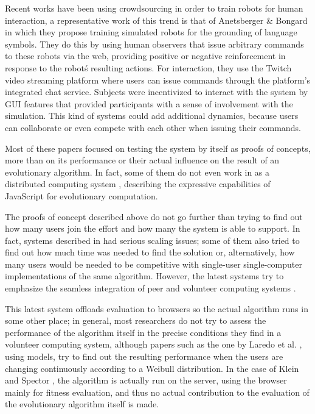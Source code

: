 \documentclass[runningheads,a4paper]{llncs}\usepackage[]{graphicx}\usepackage[]{color}
\begin{document}
Recent works have been using crowdsourcing in order to train robots 
for human interaction, a representative work of this trend is that of  
Anetsberger \& Bongard \cite{anetsbergerrobots} in which they propose 
training simulated robots for the grounding of language symbols. They do this by using human 
observers that issue arbitrary commands to these robots via the web, 
providing positive or negative reinforcement in response to the
robot\'s resulting actions. For interaction, they use the Twitch 
video streaming platform where users can issue commands through the
platform's integrated chat service. Subjects were incentivized to 
interact with the system by GUI features that provided participants
with a sense of involvement with the simulation. This kind of systems
could add additional dynamics, because users can collaborate or 
even compete with each other when issuing their commands.


Most
of these papers focused on testing the system by itself as proofs of
concepts, more than on its performance or their actual influence on
the result of an evolutionary algorithm. In fact, some of them do not
even work in as a distributed computing system
\cite{EvoStar2014:jsEO}, describing the expressive capabilities of
JavaScript for evolutionary computation. 


The proofs of concept described above do not go further than trying to
find out  how many users join the effort and how many the system is
able to support. In fact, systems described in
\cite{gecco07:workshop:dcor} had serious scaling issues; some of them
also tried to find out how much time was needed to find the solution
or, alternatively, how many users would be needed to be competitive
with single-user single-computer implementations of the same
algorithm. However, the latest systems try to emphasize the seamless
integration of peer and volunteer computing systems \cite{leclerc2016seamless}. 

This latest system offloads evaluation to browsers so the actual
algorithm runs in some other place; in general, most researchers do
not try to assess the performance of the algorithm 
itself in the precise conditions they find in a volunteer computing
system, although papers such as the one by Laredo et
al. \cite{churn08:ijhpsa}, using models, try to find out the resulting
performance when the users are changing continuously according to a
Weibull distribution. In the case of Klein and Spector \cite{unwitting-ec}, the algorithm
is actually run on the server, using the browser mainly for fitness
evaluation, and thus no actual contribution to the evaluation of the
evolutionary algorithm itself is made.
\end{document}
